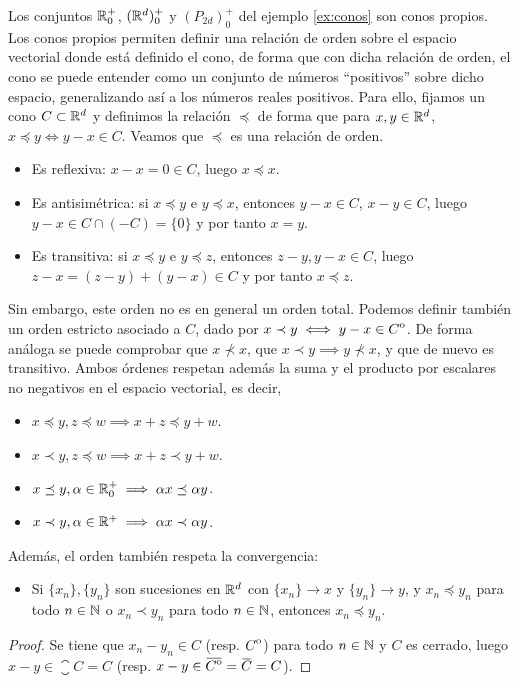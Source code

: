Los conjuntos $\mathbb{R}^+_0$, $(\mathbb{R}^d)^+_0$ y $(P_{2d})^+_0$ del ejemplo \ref{ex:conos} son conos propios. Los conos propios permiten definir una relación de orden sobre el espacio vectorial donde está definido el cono, de forma que con dicha relación de orden, el cono se puede entender como un conjunto de números ``positivos'' sobre dicho espacio, generalizando así a los números reales positivos. Para ello, fijamos un cono $C \subset \mathbb{R}^d$ y definimos la relación $\preceq$ de forma que para $x,y \in \mathbb{R}^d$, $x \preceq y \iff y - x \in C$. Veamos que $\preceq$ es una relación de orden.
\begin{itemize}
    \item Es reflexiva: $x-x = 0 \in C$, luego $x \preceq x$.
    \item Es antisimétrica: si $x \preceq y$ e $y \preceq x$, entonces $y - x \in C$, $x - y \in C$, luego $y-x \in C\cap(-C)=\{0\}$ y por tanto $x=y$.
    \item Es transitiva: si $x \preceq y$ e $y \preceq z$, entonces $z-y, y-x \in C$, luego $z-x = (z-y)+(y-x) \in C$ y por tanto $x \preceq z$.
\end{itemize}
Sin embargo, este orden no es en general un orden total. Podemos definir también un orden estricto asociado a $C$, dado por $x \prec y \iff y - x \in {\kern0ptC}^{\mathrm{o}}$. De forma análoga se puede comprobar que $x \not\prec x$, que $x \prec y \implies y \not\prec x$, y que de nuevo es transitivo. Ambos órdenes respetan además la suma y el producto por escalares no negativos en el espacio vectorial, es decir,
\begin{itemize}
    \item $x \preceq y, z \preceq w \implies x+z \preceq y+w$.
    \item $x \prec y, z \preceq w \implies x+z \prec y+w$.
    \item $x \preceq y, \alpha \in \mathbb{R}^+_0 \implies \alpha x \preceq \alpha y$.
    \item $x \prec y, \alpha \in \mathbb{R}^+ \implies \alpha x \prec \alpha y$.
\end{itemize}
Además, el orden también respeta la convergencia:
\begin{itemize}
    \item Si $\{x_n\},\{y_n\}$ son sucesiones en $\mathbb{R}^d$ con $\{x_n\} \to x$ y $\{y_n\} \to y$, y $x_n \preceq y_n$ para todo $n \in \mathbb{N}$ o $x_n \prec y_n$ para todo $n \in \mathbb{N}$, entonces $x_n \preceq y_n$.
\end{itemize}
\begin{proof}
    Se tiene que $x_n - y_n \in C$ (resp. ${\kern0ptC}^{\mathrm{o}}$) para todo $n \in \mathbb{N}$ y $C$ es cerrado, luego $x-y \in \closure{C} = C$ (resp. $x-y \in \closure{\interior{C}} = \closure{C} = C$).
\end{proof}
